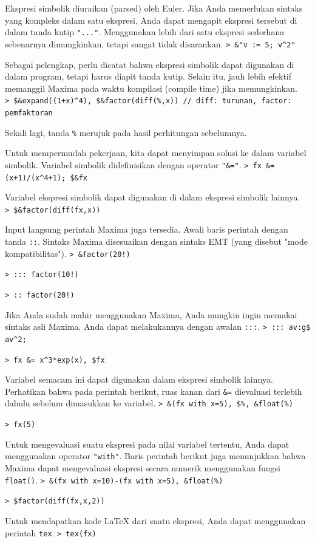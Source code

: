\documentclass[11pt, a4paper]{article}
\newcommand{\emtcmd}[1]{\noindent\texttt{\textcolor{emtcommand}{>}\ #1}\par\smallskip}
\begin{document}
Ekspresi simbolik diuraikan (parsed) oleh Euler. Jika Anda memerlukan sintaks yang kompleks dalam satu ekspresi, Anda dapat mengapit ekspresi tersebut di dalam tanda kutip \texttt{"..."}. Menggunakan lebih dari satu ekspresi sederhana sebenarnya dimungkinkan, tetapi sangat tidak disarankan.
\emtcmd{\&"v := 5; v\^{}2"}

Sebagai pelengkap, perlu dicatat bahwa ekspresi simbolik dapat digunakan di dalam program, tetapi harus diapit tanda kutip. Selain itu, jauh lebih efektif memanggil Maxima pada waktu kompilasi (compile time) jika memungkinkan.
\emtcmd{\$\&expand((1+x)\^{}4), \$\&factor(diff(\%,x)) \textcolor{emtcomment}{// diff: turunan, factor: pemfaktoran}}

Sekali lagi, tanda \texttt{\%} merujuk pada hasil perhitungan sebelumnya.

Untuk mempermudah pekerjaan, kita dapat menyimpan solusi ke dalam variabel simbolik. Variabel simbolik didefinisikan dengan operator \texttt{"\&="}.
\emtcmd{fx \&= (x+1)/(x\^{}4+1); \$\&fx}

Variabel ekspresi simbolik dapat digunakan di dalam ekspresi simbolik lainnya.
\emtcmd{\$\&factor(diff(fx,x))}

Input langsung perintah Maxima juga tersedia. Awali baris perintah dengan tanda \texttt{::}. Sintaks Maxima disesuaikan dengan sintaks EMT (yang disebut "mode kompatibilitas").
\emtcmd{\&factor(20!)}
\emtcmd{::: factor(10!)}
\emtcmd{:: factor(20!)}

Jika Anda sudah mahir menggunakan Maxima, Anda mungkin ingin memakai sintaks asli Maxima. Anda dapat melakukannya dengan awalan \texttt{:::}.
\emtcmd{::: av:g\$ av\^{}2;}
\emtcmd{fx \&= x\^{}3*exp(x), \$fx}

Variabel semacam ini dapat digunakan dalam ekspresi simbolik lainnya. Perhatikan bahwa pada perintah berikut, ruas kanan dari \texttt{\&=} dievaluasi terlebih dahulu sebelum dimasukkan ke variabel.
\emtcmd{\&(fx with x=5), \$\%, \&float(\%)}
\emtcmd{fx(5)}

Untuk mengevaluasi suatu ekspresi pada nilai variabel tertentu, Anda dapat menggunakan operator \texttt{"with"}. Baris perintah berikut juga menunjukkan bahwa Maxima dapat mengevaluasi ekspresi secara numerik menggunakan fungsi \texttt{float()}.
\emtcmd{\&(fx with x=10)-(fx with x=5), \&float(\%)}
\emtcmd{\$factor(diff(fx,x,2))}

Untuk mendapatkan kode LaTeX dari suatu ekspresi, Anda dapat menggunakan perintah \texttt{tex}.
\emtcmd{tex(fx)}
\end{document}
